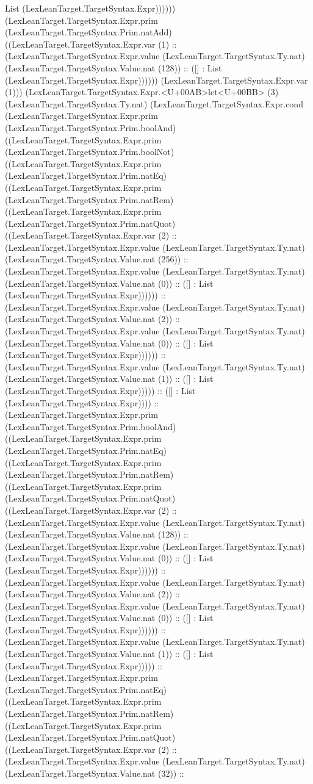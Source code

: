 \documentclass[11pt]{article}
\begin{document}
List (LexLeanTarget.TargetSyntax.Expr)))))) (LexLeanTarget.TargetSyntax.Expr.prim (LexLeanTarget.TargetSyntax.Prim.natAdd) ((LexLeanTarget.TargetSyntax.Expr.var (1) :: (LexLeanTarget.TargetSyntax.Expr.value (LexLeanTarget.TargetSyntax.Ty.nat) (LexLeanTarget.TargetSyntax.Value.nat (128)) :: ([] : List (LexLeanTarget.TargetSyntax.Expr)))))) (LexLeanTarget.TargetSyntax.Expr.var (1))) (LexLeanTarget.TargetSyntax.Expr.<U+00AB>let<U+00BB> (3) (LexLeanTarget.TargetSyntax.Ty.nat) (LexLeanTarget.TargetSyntax.Expr.cond (LexLeanTarget.TargetSyntax.Expr.prim (LexLeanTarget.TargetSyntax.Prim.boolAnd) ((LexLeanTarget.TargetSyntax.Expr.prim (LexLeanTarget.TargetSyntax.Prim.boolNot) ((LexLeanTarget.TargetSyntax.Expr.prim (LexLeanTarget.TargetSyntax.Prim.natEq) ((LexLeanTarget.TargetSyntax.Expr.prim (LexLeanTarget.TargetSyntax.Prim.natRem) ((LexLeanTarget.TargetSyntax.Expr.prim (LexLeanTarget.TargetSyntax.Prim.natQuot) ((LexLeanTarget.TargetSyntax.Expr.var (2) :: (LexLeanTarget.TargetSyntax.Expr.value (LexLeanTarget.TargetSyntax.Ty.nat) (LexLeanTarget.TargetSyntax.Value.nat (256)) :: (LexLeanTarget.TargetSyntax.Expr.value (LexLeanTarget.TargetSyntax.Ty.nat) (LexLeanTarget.TargetSyntax.Value.nat (0)) :: ([] : List (LexLeanTarget.TargetSyntax.Expr)))))) :: (LexLeanTarget.TargetSyntax.Expr.value (LexLeanTarget.TargetSyntax.Ty.nat) (LexLeanTarget.TargetSyntax.Value.nat (2)) :: (LexLeanTarget.TargetSyntax.Expr.value (LexLeanTarget.TargetSyntax.Ty.nat) (LexLeanTarget.TargetSyntax.Value.nat (0)) :: ([] : List (LexLeanTarget.TargetSyntax.Expr)))))) :: (LexLeanTarget.TargetSyntax.Expr.value (LexLeanTarget.TargetSyntax.Ty.nat) (LexLeanTarget.TargetSyntax.Value.nat (1)) :: ([] : List (LexLeanTarget.TargetSyntax.Expr))))) :: ([] : List (LexLeanTarget.TargetSyntax.Expr)))) :: (LexLeanTarget.TargetSyntax.Expr.prim (LexLeanTarget.TargetSyntax.Prim.boolAnd) ((LexLeanTarget.TargetSyntax.Expr.prim (LexLeanTarget.TargetSyntax.Prim.natEq) ((LexLeanTarget.TargetSyntax.Expr.prim (LexLeanTarget.TargetSyntax.Prim.natRem) ((LexLeanTarget.TargetSyntax.Expr.prim (LexLeanTarget.TargetSyntax.Prim.natQuot) ((LexLeanTarget.TargetSyntax.Expr.var (2) :: (LexLeanTarget.TargetSyntax.Expr.value (LexLeanTarget.TargetSyntax.Ty.nat) (LexLeanTarget.TargetSyntax.Value.nat (128)) :: (LexLeanTarget.TargetSyntax.Expr.value (LexLeanTarget.TargetSyntax.Ty.nat) (LexLeanTarget.TargetSyntax.Value.nat (0)) :: ([] : List (LexLeanTarget.TargetSyntax.Expr)))))) :: (LexLeanTarget.TargetSyntax.Expr.value (LexLeanTarget.TargetSyntax.Ty.nat) (LexLeanTarget.TargetSyntax.Value.nat (2)) :: (LexLeanTarget.TargetSyntax.Expr.value (LexLeanTarget.TargetSyntax.Ty.nat) (LexLeanTarget.TargetSyntax.Value.nat (0)) :: ([] : List (LexLeanTarget.TargetSyntax.Expr)))))) :: (LexLeanTarget.TargetSyntax.Expr.value (LexLeanTarget.TargetSyntax.Ty.nat) (LexLeanTarget.TargetSyntax.Value.nat (1)) :: ([] : List (LexLeanTarget.TargetSyntax.Expr))))) :: (LexLeanTarget.TargetSyntax.Expr.prim (LexLeanTarget.TargetSyntax.Prim.natEq) ((LexLeanTarget.TargetSyntax.Expr.prim (LexLeanTarget.TargetSyntax.Prim.natRem) ((LexLeanTarget.TargetSyntax.Expr.prim (LexLeanTarget.TargetSyntax.Prim.natQuot) ((LexLeanTarget.TargetSyntax.Expr.var (2) :: (LexLeanTarget.TargetSyntax.Expr.value (LexLeanTarget.TargetSyntax.Ty.nat) (LexLeanTarget.TargetSyntax.Value.nat (32)) :: 
\end{document}
